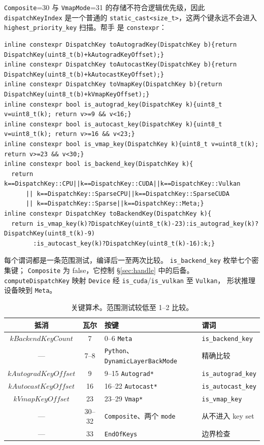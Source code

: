 \texttt{Composite}=30 与 \texttt{VmapMode}=31
的存储不符合逻辑优先级，因此
\texttt{dispatchKeyIndex} 是一个普通的
\texttt{static\_cast<size\_t>}，这两个键永远不会进入
\texttt{highest\_priority\_key} 扫描。帮手
 是 \texttt{constexpr}：

\begin{lstlisting}[caption={arithmetic helpers.}, label=lst:dispatchhelpers]
inline constexpr DispatchKey toAutogradKey(DispatchKey b){return DispatchKey(uint8_t(b)+kAutogradKeyOffset);}
inline constexpr DispatchKey toAutocastKey(DispatchKey b){return DispatchKey(uint8_t(b)+kAutocastKeyOffset);}
inline constexpr DispatchKey toVmapKey(DispatchKey b){return DispatchKey(uint8_t(b)+kVmapKeyOffset);}
inline constexpr bool is_autograd_key(DispatchKey k){uint8_t v=uint8_t(k); return v>=9 && v<16;}
inline constexpr bool is_autocast_key(DispatchKey k){uint8_t v=uint8_t(k); return v>=16 && v<23;}
inline constexpr bool is_vmap_key(DispatchKey k){uint8_t v=uint8_t(k); return v>=23 && v<30;}
inline constexpr bool is_backend_key(DispatchKey k){
  return k==DispatchKey::CPU||k==DispatchKey::CUDA||k==DispatchKey::Vulkan
      || k==DispatchKey::SparseCPU||k==DispatchKey::SparseCUDA
      || k==DispatchKey::Sparse||k==DispatchKey::Meta;}
inline constexpr DispatchKey toBackendKey(DispatchKey k){
  return is_vmap_key(k)?DispatchKey(uint8_t(k)-23):is_autograd_key(k)?DispatchKey(uint8_t(k)-9)
        :is_autocast_key(k)?DispatchKey(uint8_t(k)-16):k;}
\end{lstlisting}

每个谓词都是一条范围测试，编译后一至两次比较。
\texttt{is\_backend\_key} 枚举七个密集键； \texttt{Composite}
为 false，它控制 \S\ref{sec:handle} 中的后备。
\texttt{computeDispatchKey} 映射 \texttt{Device}
经 \texttt{is\_cuda}/\texttt{is\_vulkan} 至 \texttt{Vulkan}，
形状推理设备映到 \texttt{Meta}。

\begin{table}[H]
\centering
\caption{关键算术。范围测试较低至 1--2 比较。}
\label{tab:keyoffsets}
\small
\begin{tabular}{ccll}
\toprule
抵消 & 瓦尔 & 按键 & 谓词 \\
\midrule
$kBackendKeyCount$ & 7 & 0--6 \texttt{Meta} & \texttt{is\_backend\_key} \\
--- & 7--8 & \texttt{Python}、\texttt{DynamicLayerBackMode} & 精确比较 \\
$kAutogradKeyOffset$ & 9 & 9--15 \texttt{Autograd*} & \texttt{is\_autograd\_key} \\
$kAutocastKeyOffset$ & 16 & 16--22 \texttt{Autocast*} & \texttt{is\_autocast\_key} \\
$kVmapKeyOffset$ & 23 & 23--29 \texttt{Vmap*} & \texttt{is\_vmap\_key} \\
--- & 30--32 & \texttt{Composite}、两个 \texttt{mode} & 从不进入 key set \\
--- & 33 & \texttt{EndOfKeys} & 边界检查 \\
\bottomrule
\end{tabular}
\end{table}

